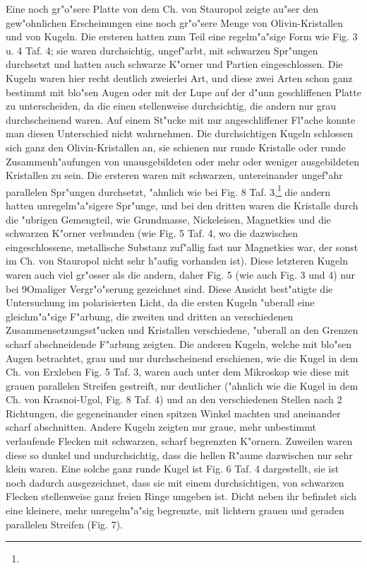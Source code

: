 \documentclass[a4paper, 11pt, oneside]{article}
\begin{document}
Eine noch gr"o"sere Platte von dem Ch. von Stauropol zeigte au"ser den gew"ohnlichen Erscheinungen eine noch gr"o"sere Menge von Olivin-Kristallen und von Kugeln. Die ersteren hatten zum Teil eine regelm"a"sige Form wie Fig. 3 u. 4 Taf. 4; sie waren durchsichtig, ungef"arbt, mit schwarzen Spr"ungen durchsetzt und hatten auch schwarze K"orner und Partien eingeschlossen. Die Kugeln waren hier recht deutlich zweierlei Art, und diese zwei Arten schon ganz bestimmt mit blo"sen Augen oder mit der Lupe auf der d"unn geschliffenen Platte zu unterscheiden, da die einen stellenweise durchsichtig, die andern nur grau durchscheinend waren. Auf einem St"ucke mit nur angeschliffener Fl"ache konnte man diesen Unterschied nicht wahrnehmen. Die durchsichtigen Kugeln schlossen sich ganz den Olivin-Kristallen an, sie schienen nur runde Kristalle oder runde Zusammenh"aufungen von unausgebildeten oder mehr oder weniger ausgebildeten Kristallen zu sein. Die ersteren waren mit schwarzen, untereinander ungef"ahr parallelen Spr"ungen durchsetzt, "ahnlich wie bei Fig. 8 Taf. 3,\footnote{} die andern hatten unregelm"a"sigere Spr"unge, und bei den dritten waren die Kristalle durch die "ubrigen Gemengteil, wie Grundmasse, Nickeleisen, Magnetkies und die schwarzen K"orner verbunden (wie Fig. 5 Taf. 4, wo die dazwischen eingeschlossene, metallische Substanz zuf"allig fast nur Magnetkies war, der sonst im Ch. von Stauropol nicht sehr h"aufig vorhanden ist). Diese letzteren Kugeln waren auch viel gr"osser als die andern, daher Fig. 5 (wie auch Fig. 3 und 4) nur bei 9Omaliger Vergr"o"serung gezeichnet sind. Diese Ansicht best"atigte die Untersuchung im polarisierten Licht, da die ersten Kugeln "uberall eine gleichm"a"sige F"arbung, die zweiten und dritten an verschiedenen Zusammensetzungsst"ucken und Kristallen verschiedene, "uberall an den Grenzen scharf abschneidende F"arbung zeigten. Die anderen Kugeln, welche mit blo"sen Augen betrachtet, grau und nur durchscheinend erschienen, wie die Kugel in dem Ch. von Erxleben Fig. 5 Taf. 3, waren auch unter dem Mikroskop wie diese mit grauen parallelen Streifen gestreift, nur deutlicher ("ahnlich wie die Kugel in dem Ch. von Krasnoi-Ugol, Fig. 8 Taf. 4) und an den verschiedenen Stellen nach 2 Richtungen, die gegeneinander einen spitzen Winkel machten und aneinander scharf abschnitten. Andere Kugeln zeigten nur graue, mehr unbestimmt verlaufende Flecken mit schwarzen, scharf begrenzten K"ornern. Zuweilen waren diese so dunkel und undurchsichtig, dass die hellen R"aume dazwischen nur sehr klein waren. Eine solche ganz runde Kugel ist Fig. 6 Taf. 4 dargestellt, sie ist noch dadurch ausgezeichnet, dass sie mit einem durchsichtigen, von schwarzen Flecken stellenweise ganz freien Ringe umgeben ist. Dicht neben ihr befindet sich eine kleinere, mehr unregelm"a"sig begrenzte, mit lichtern grauen und geraden parallelen Streifen (Fig. 7).
\end{document}

